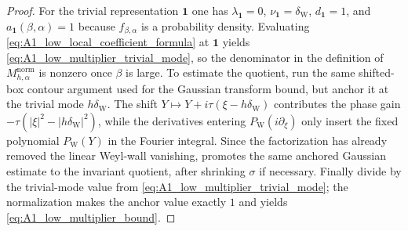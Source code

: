 \begin{proof}
For the trivial representation $\mathbf 1$ one has $\lambda_{\mathbf 1}=0$, $\nu_{\mathbf 1}=\delta_{\mathrm W}$, $d_{\mathbf 1}=1$, and
$a_{\mathbf 1}(\beta,\alpha)=1$ because $f_{\beta,\alpha}$ is a probability density.
Evaluating \eqref{eq:A1_low_local_coefficient_formula} at $\mathbf 1$ yields \eqref{eq:A1_low_multiplier_trivial_mode}, so the denominator in the definition of $M_{h,\alpha}^{\mathrm{norm}}$ is nonzero once $\beta$ is large.
To estimate the quotient, run the same shifted-box contour argument used for the Gaussian transform bound, but anchor it at the trivial mode $h\delta_{\mathrm W}$.
The shift $Y\mapsto Y+i\tau(\xi-h\delta_{\mathrm W})$ contributes the phase gain
$-\tau(|\xi|^2-|h\delta_{\mathrm W}|^2)$, while the derivatives entering $P_{\mathrm W}(i\partial_\xi)$ only insert the fixed polynomial $P_{\mathrm W}(Y)$ in the Fourier integral.
Since the factorization has already removed the linear Weyl-wall vanishing,  promotes the same anchored Gaussian estimate to the invariant quotient, after shrinking $\sigma$ if necessary.
Finally divide by the trivial-mode value from \eqref{eq:A1_low_multiplier_trivial_mode}; the normalization makes the anchor value exactly $1$ and yields \eqref{eq:A1_low_multiplier_bound}.
\end{proof}

